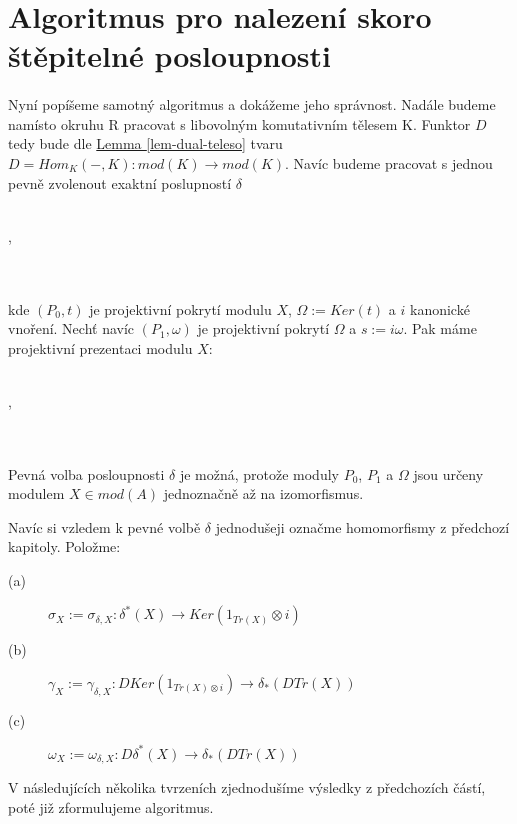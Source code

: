   \section{Algoritmus pro nalezení skoro štěpitelné posloupnosti} 
  
    \paragraph{ } Nyní popíšeme samotný algoritmus a dokážeme jeho správnost.
    Nadále budeme namísto  okruhu R pracovat s libovolným komutativním tělesem K. 
    Funktor $D$ tedy bude dle \hyperref[lem-dual-teleso]{Lemma \ref*{lem-dual-teleso}} 
    tvaru $D=Hom_K(-,K):mod(K)\rightarrow mod(K)$.      
    Navíc budeme pracovat s jednou pevně zvolenout exaktní 
    poslupností $\delta$ \\\\
      \centerline{,}\\\\
    kde $(P_0, t)$ je projektivní pokrytí modulu $X$, $\Omega:=Ker(t)$ a $i$ kanonické vnoření. Nechť navíc $(P_1, \omega)$ 
    je projektivní pokrytí $\Omega$ a $s:=i\omega$.  Pak máme projektivní 
    prezentaci modulu $X$:\\\\
      \centerline{,}\\\\
    Pevná volba posloupnosti $\delta$ je možná, protože moduly $P_0$, $P_1$ a $\Omega$ 
    jsou určeny modulem $X\in mod(A)$ jednoznačně až na izomorfismus.
    
    Navíc si vzledem k pevné volbě $\delta$ jednodušeji označme 
    homomorfismy z předchozí kapitoly. Položme:
    \begin{description}
      \item[(a)] $\sigma_X:=\sigma_{\delta,X}:\delta^*(X)\rightarrow Ker(1_{Tr(X)}\otimes i)$ 
      \item[(b)] $\gamma_X:=\gamma_{\delta,X}: DKer(1_{Tr(X)\otimes i})\rightarrow \delta_*(DTr(X))$ 
      \item[(c)]  $\omega_X:=\omega_{\delta,X}: D\delta^*(X) \rightarrow \delta_*(DTr(X))$ 
    \end{description}
    
    V následujících několika tvrzeních zjednodušíme výsledky z předchozích 
    částí, poté již zformulujeme algoritmus.
  
